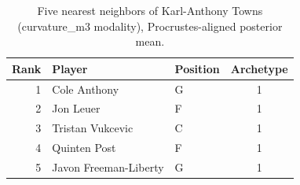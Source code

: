 \begin{table}[htbp]
  \centering\small
  \begin{tabular}{rllc}
    \toprule
    Rank & Player & Position & Archetype \\
    \midrule
    1 & Cole Anthony & G & 1 \\
    2 & Jon Leuer & F & 1 \\
    3 & Tristan Vukcevic & C & 1 \\
    4 & Quinten Post & F & 1 \\
    5 & Javon Freeman-Liberty & G & 1 \\
    \bottomrule
  \end{tabular}
  \caption{Five nearest neighbors of Karl-Anthony Towns (curvature_m3 modality), Procrustes-aligned posterior mean.}
  \label{tab:Karl_Anthony_Towns_neighbors_curvature_m3}
\end{table}

